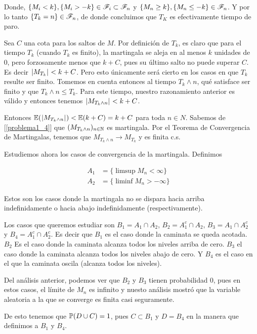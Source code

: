 Donde, $\{ M_i < k \}, \{ M_i > -k \} \in \mathscr{F}_i \subset \mathscr{F}_n$ y $\{ M_n \geq k \}, \{ M_n \leq -k \} \in \mathscr{F}_n$. 
Y por lo tanto $\{ T_k = n\} \in \mathscr{F}_n$, de donde concluimos que $T_K$ es efectivamente tiempo de paro.\par\null


Sea $C$ una cota para los saltos de $M$. Por definición de $T_k$, es claro que para el tiempo $T_k$ (cuando $T_k$ es finito), 
la martingala se aleja en al menos $k$ unidades de 0, pero forzosamente menos que $k + C$, pues su último salto no 
puede superar $C$. Es decir $\hspace{.25mm}\left|M_{T_k}\right|\hspace{.25mm} < k + C$. Pero esto únicamente será cierto en los casos en que $T_k$ resulte 
ser finito. Tomemos en cuenta entonces al tiempo $T_k \wedge n$, qué satisface ser finito y que $T_k \wedge n \leq T_k$. 
Para este tiempo, nuestro razonamiento anterior es válido y entonces tenemos $\hspace{.25mm}\left|M_{T_k \wedge n}\right|\hspace{.25mm} < k + C$.\par\null

Entonces $\mathbb{E}(\hspace{.25mm}\left|M_{T_k \wedge n}\right|\hspace{.25mm}) < \mathbb{E}(k + C) = k + C$ para toda $n \in N$. Sabemos de [\ref{problema1_4}] que 
$(M_{T_k \wedge n})_{n \in \mathbb{N}}$ es martingala. Por el Teorema de Convergencia de Martingalas, tenemos que 
$M_{T_k \wedge n} \longrightarrow M_{T_k}$ y es finita c.s.\par\null

Estudiemos ahora los casos de convergencia de la martingala. Definimos

\begin{align}
        A_1     &=  \{ \limsup M_n < \infty     \}    \\
        A_2     &=  \{ \liminf M_n > -\infty    \}
\end{align}

Estos son los casos donde la martingala no se dispara hacia arriba indefinidamente o hacia abajo indefinidamente
(respectivamente).\par\null

Los casos que queremos estudiar son $B_1 = A_1 \cap A_2$, $B_2 = A_1^c \cap A_2$, $B_3 = A_1 \cap A_2^c$ y 
$B_4 = A_1^c \cap A_2^c$. Es decir que $B_1$ es el caso donde la caminata se queda acotada. $B_2$ Es el caso 
donde la caminata alcanza todos los niveles arriba de cero. $B_3$ el caso donde la caminata alcanza todos 
los niveles abajo de cero. Y $B_4$ es el caso en el que la caminata oscila (alcanza todos los niveles).\par\null

Del análisis anterior, podemos ver que $B_2$ y $B_3$ tienen probabilidad 0, pues en estos casos, el límite de
$M_n$ es infinito y nuesto análisis mostró que la variable aleatoria a la que se converge es finita casi seguramente.\par\null

De esto tenemos que $\mathbb{P}(D \cup C) = 1$, pues $C \subset B_1$ y $D = B_4$ en la manera que definimos a $B_1$ y $B_4$.\par\null

